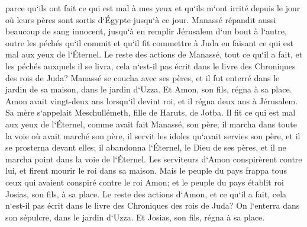\verse parce qu`ils ont fait ce qui est mal à mes yeux et qu`ils m`ont irrité depuis le jour où leurs pères sont sortis d`Égypte jusqu`à ce jour. 
\verse Manassé répandit aussi beaucoup de sang innocent, jusqu`à en remplir Jérusalem d`un bout à l`autre, outre les péchés qu`il commit et qu`il fit commettre à Juda en faisant ce qui est mal aux yeux de l`Éternel. 
\verse Le reste des actions de Manassé, tout ce qu`il a fait, et les péchés auxquels il se livra, cela n`est-il pas écrit dans le livre des Chroniques des rois de Juda? 
\verse Manassé se coucha avec ses pères, et il fut enterré dans le jardin de sa maison, dans le jardin d`Uzza. Et Amon, son fils, régna à sa place. 
\verse Amon avait vingt-deux ans lorsqu`il devint roi, et il régna deux ans à Jérusalem. Sa mère s`appelait Meschullémeth, fille de Haruts, de Jotba. 
\verse Il fit ce qui est mal aux yeux de l`Éternel, comme avait fait Manassé, son père; 
\verse il marcha dans toute la voie où avait marché son père, il servit les idoles qu`avait servies son père, et il se prosterna devant elles; 
\verse il abandonna l`Éternel, le Dieu de ses pères, et il ne marcha point dans la voie de l`Éternel. 
\verse Les serviteurs d`Amon conspirèrent contre lui, et firent mourir le roi dans sa maison. 
\verse Mais le peuple du pays frappa tous ceux qui avaient conspiré contre le roi Amon; et le peuple du pays établit roi Josias, son fils, à sa place. 
\verse Le reste des actions d`Amon, et ce qu`il a fait, cela n`est-il pas écrit dans le livre des Chroniques des rois de Juda? 
\verse On l`enterra dans son sépulcre, dans le jardin d`Uzza. Et Josias, son fils, régna à sa place. 

